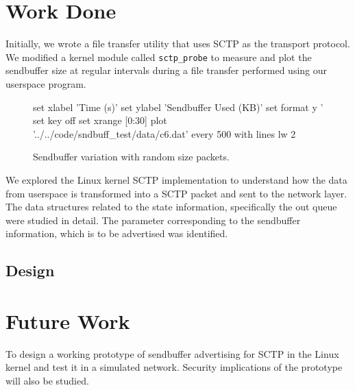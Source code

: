 \documentclass[a4paper,11pt]{article}
\begin{document}
\section{Work Done}
Initially, we wrote a file transfer utility that uses SCTP as the
transport protocol.
We modified a kernel module called \texttt{sctp\_probe} to measure and plot
the sendbuffer size at regular intervals during a file transfer performed
using our userspace program.

\begin{figure}[h]
	\centering
	\begin{gnuplot}[terminal=cairolatex, terminaloptions={monochrome}]
		set xlabel 'Time (s)'
		set ylabel 'Sendbuffer Used (KB)\vspace{0.5cm}'
		set format y '%
		set key off
		set xrange [0:30]
		plot '../../code/sndbuff_test/data/c6.dat' every 500 with lines lw 2
	\end{gnuplot}
	\caption{Sendbuffer variation with random size packets.}
\end{figure}


We explored the Linux kernel SCTP implementation to understand how the
data from userspace is transformed into a SCTP packet and sent to the network
layer.
The data structures related to the state information, specifically
the out queue were studied in detail. The parameter corresponding to the
sendbuffer information, which is to be advertised was identified.


\subsection{Design}

\section{Future Work}
To design a working prototype of sendbuffer advertising for SCTP in the Linux
kernel and test it in a simulated network. Security implications of the
prototype will also be studied.

\printbibliography
\end{document}
